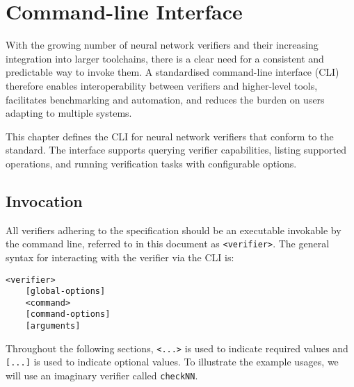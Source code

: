 \chapter{Command-line Interface}
\label{sec:solver_interface}

\newcommand{\clOutputOption}[3]{
\paragraph{\texttt{#1}}
\begin{itemize}
    \item \textbf{Description}: #2
    \item \textbf{Output}: #3
    \item \textbf{Example usage}:
\end{itemize}
}

\newcommand{\clOption}[3]{
\paragraph{\texttt{#1}}
\begin{itemize}
    \item \textbf{Description}: #2
    \item \textbf{Example usage}: \texttt{#3}
\end{itemize}
}


\newcommand{\exampleVerifier}{checkNN}

With the growing number of neural network verifiers and their increasing integration into larger toolchains, there is a clear need for a consistent and predictable way to invoke them. A standardised command-line interface (CLI) therefore enables interoperability between verifiers and higher-level tools, facilitates benchmarking and automation, and reduces the burden on users adapting to multiple systems.

This chapter defines the CLI for neural network verifiers that conform to the \vnnlib{} standard. The interface supports querying verifier capabilities, listing supported operations, and running verification tasks with configurable options.

\section{Invocation}

All verifiers adhering to the \vnnlib{} specification should be an executable invokable by the command line, referred to in this document as \texttt{<verifier>}. The general syntax for interacting with the verifier via the CLI is:
\begin{lstlisting}[style=bash]
<verifier>
    [global-options] 
    <command> 
    [command-options] 
    [arguments] 
\end{lstlisting}
Throughout the following sections, \texttt{<...>} is used to indicate required values and \texttt{[...]} is used to indicate optional values. To illustrate the example usages, we will  use an imaginary verifier called \texttt{\exampleVerifier}.

